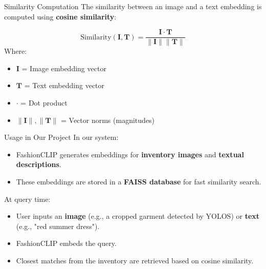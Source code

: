   \begin{frame}{Similarity Computation}
  The similarity between an image and a text embedding is computed using \textbf{cosine similarity}:

  \[
  \text{Similarity}(\mathbf{I}, \mathbf{T}) = \frac{\mathbf{I} \cdot \mathbf{T}}{\|\mathbf{I}\| \|\mathbf{T}\|}
  \]
\small
  Where:
  \begin{itemize}
      \setlength\itemsep{-0.25em}
      \item $\mathbf{I}$ = Image embedding vector
      \item $\mathbf{T}$ = Text embedding vector
      \item $\cdot$ = Dot product
      \item $\|\mathbf{I}\|, \|\mathbf{T}\|$ = Vector norms (magnitudes)
  \end{itemize}
  \end{frame}

  \begin{frame}{Usage in Our Project}
  In our system:
  \begin{itemize}
      \item FashionCLIP generates embeddings for \textbf{inventory images} and \textbf{textual descriptions}.
      \item These embeddings are stored in a \textbf{FAISS database} for fast similarity search.
  \end{itemize}

  \vspace{0.5em}

  At query time:
  \begin{itemize}
      \item User inputs an \textbf{image} (e.g., a cropped garment detected by YOLOS) or \textbf{text} (e.g., "red summer dress").
      \item FashionCLIP embeds the query.
      \item Closest matches from the inventory are retrieved based on cosine similarity.
  \end{itemize}
  \end{frame}

